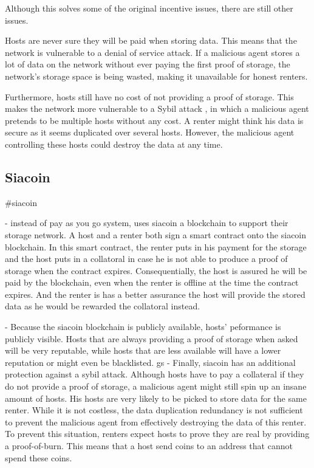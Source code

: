 Although this solves some of the original incentive issues, there are still other issues. 

Hosts are never sure they will be paid when storing data. This means that the network is vulnerable to a denial of service attack. If a malicious agent stores a lot of data on the network without ever paying the first proof of storage, the network's storage space is being wasted, making it unavailable for honest renters.

Furthermore, hosts still have no cost of not providing a proof of storage. This makes the network more vulnerable to a Sybil attack \cite{sybil-attack}, in which a malicious agent pretends to be multiple hosts without any cost. A renter might think his data is secure as it seems duplicated over several hosts. However, the malicious agent controlling these hosts could destroy the data at any time.

\subsection{Siacoin}

\iffalse
#siacoin

- instead of pay as you go system, uses siacoin a blockchain to support their storage network. A host and a renter both sign a smart contract onto the siacoin blockchain. In this smart contract, the renter puts in his payment for the storage and the host puts in a collatoral in case he is not able to produce a proof of storage when the contract expires. Consequentially, the host is assured he will be paid by the blockchain, even when the renter is offline at the time the contract expires. And the renter is has a better assurance the host will provide the stored data as he would be rewarded the collatoral instead.

- Because the siacoin blockchain is publicly available, hosts' peformance is publicly visible. Hosts that are always providing a proof of storage when asked will be very reputable, while hosts that are less available will have a lower reputation or might even be blacklisted.
gs
- Finally, siacoin has an additional protection against a sybil attack. Although hosts have to pay a collateral if they do not provide a proof of storage, a malicious agent might still spin up an insane amount of hosts. His hosts are very likely to be picked to store data for the same renter. While it is not costless, the data duplication redundancy is not sufficient to prevent the malicious agent from effectively destroying the data of this renter. To prevent this situation, renters expect hosts to prove they are real by providing a proof-of-burn. This means that a host send coins to an address that cannot spend these coins.

